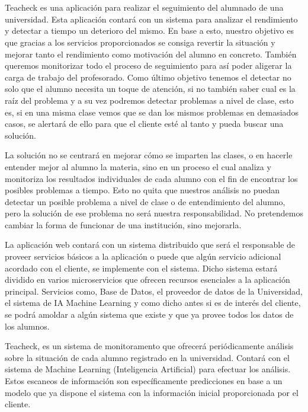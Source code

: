 \chapter{\descripcionProducto}

\paragraph{}
Teacheck es una aplicación para realizar el seguimiento del alumnado de una universidad.
Esta aplicación contará con un sistema para analizar el rendimiento y detectar a tiempo un deterioro del mismo. En base a esto, nuestro objetivo es que gracias a los servicios proporcionados se consiga revertir la situación y mejorar tanto el rendimiento como motivación del alumno en concreto. También queremos monitorizar todo el proceso de seguimiento para así poder aligerar la carga de trabajo del profesorado. Como último objetivo tenemos el detectar no solo que el alumno necesita un toque de atención, si no también saber cual es la raíz del problema y a su vez podremos detectar problemas a nivel de clase, esto es, si en una misma clase vemos que se dan los mismos problemas en demasiados casos, se alertará de ello para que el cliente esté al tanto y pueda buscar una solución.

La solución no se centrará en mejorar cómo se imparten las clases, o en hacerle entender mejor al alumno la materia, sino en un proceso el cual analiza y monitoriza los resultados individuales de cada alumno con el fin de encontrar los posibles problemas a tiempo. Esto no quita que nuestros análisis no puedan detectar un posible problema a nivel de clase o de entendimiento del alumno, pero la solución de ese problema no será nuestra responsabilidad. No pretendemos cambiar la forma de funcionar de una institución, sino mejorarla.

La aplicación web contará con un sistema distribuido que será el responsable de proveer servicios básicos a la aplicación o puede que algún servicio adicional acordado con el cliente, se implemente con el sistema. Dicho sistema estará dividido en varios microservicios que ofrecen recursos esenciales a la aplicación principal. Servicios como, Base de Datos, el proveedor de datos de la Universidad, el sistema de IA Machine Learning y como dicho antes si es de interés del cliente, se podrá amoldar a algún sistema que existe y que ya provee todos los datos de los alumnos.

Teacheck, es un sistema de monitoramento que ofrecerá periódicamente análisis sobre la situación de cada alumno registrado en la universidad. Contará con el sistema de Machine Learning (Inteligencia Artificial)  para efectuar los análisis. Estos escaneos de información son específicamente predicciones en base a un modelo que ya dispone el sistema con la información inicial proporcionada por el cliente.

